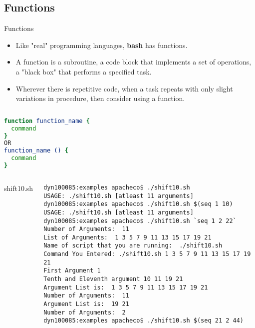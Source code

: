\documentclass[10pt,t]{beamer}
\begin{document}
\subsection{Functions}
\begin{frame}{Functions}
  \begin{itemize}
    \item Like "real" programming languages, \textbf{bash} has functions.
    \item A function is a subroutine, a code block that implements a set of operations, a "black box" that performs a specified task. 
    \item Wherever there is repetitive code, when a task repeats with only slight variations in procedure, then consider using a function.
  \end{itemize}
  \begin{columns}
    \column{5cm}
    {\scriptsize
      \begin{exampleblock}{}
        \begin{lstlisting}[language=bash]
function function_name {
  command
}
OR
function_name () {
  command
}
        \end{lstlisting}
      \end{exampleblock}
    }
  \end{columns}
  \framebreak
    \begin{columns}
      \begin{exampleblock}{shift10.sh}
        
      \end{exampleblock}
        \begin{lstlisting}[style=LINUX,basicstyle=\fontsize{4}{4.5}\selectfont\ttfamily]
dyn100085:examples apacheco$ ./shift10.sh
USAGE: ./shift10.sh [atleast 11 arguments]
dyn100085:examples apacheco$ ./shift10.sh $(seq 1 10)
USAGE: ./shift10.sh [atleast 11 arguments]
dyn100085:examples apacheco$ ./shift10.sh `seq 1 2 22`
Number of Arguments:  11
List of Arguments:  1 3 5 7 9 11 13 15 17 19 21
Name of script that you are running:  ./shift10.sh
Command You Entered: ./shift10.sh 1 3 5 7 9 11 13 15 17 19 21
First Argument 1
Tenth and Eleventh argument 10 11 19 21
Argument List is:  1 3 5 7 9 11 13 15 17 19 21
Number of Arguments:  11
Argument List is:  19 21
Number of Arguments:  2
dyn100085:examples apacheco$ ./shift10.sh $(seq 21 2 44)

\end{lstlisting}
\end{columns}
\end{frame}
\end{document}
